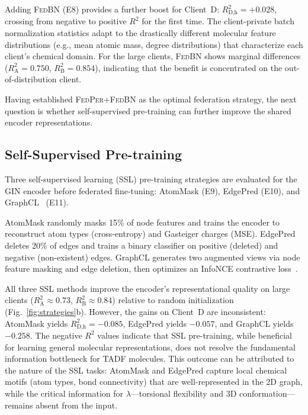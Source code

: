 \documentclass[twocolumn]{article}
\newcommand{\lam}{\lambda}
\newcommand{\Rsq}{R^{2}}
\newcommand{\FedPer}{\textsc{FedPer}}
\newcommand{\FedBN}{\textsc{FedBN}}
\begin{document}
Adding \FedBN{} (E8) provides a further boost for Client~D: $\Rsq_{\text{D,h}} = +0.028$, crossing from negative to positive $\Rsq$ for the first time.
The client-private batch normalization statistics adapt to the drastically different molecular feature distributions (e.g., mean atomic mass, degree distributions) that characterize each client's chemical domain.
For the large clients, \FedBN{} shows marginal differences ($\Rsq_\text{A} = 0.750$, $\Rsq_\text{B} = 0.854$), indicating that the benefit is concentrated on the out-of-distribution client.

Having established \FedPer{}+\FedBN{} as the optimal federation strategy, the next question is whether self-supervised pre-training can further improve the shared encoder representations.

\subsection{Self-Supervised Pre-training}\label{sec:ssl}

Three self-supervised learning (SSL) pre-training strategies are evaluated for the GIN encoder before federated fine-tuning: AtomMask (E9), EdgePred (E10), and GraphCL~\cite{You2020_GraphCL} (E11).

AtomMask randomly masks 15\% of node features and trains the encoder to reconstruct atom types (cross-entropy) and Gasteiger charges (MSE).
EdgePred deletes 20\% of edges and trains a binary classifier on positive (deleted) and negative (non-existent) edges.
GraphCL generates two augmented views via node feature masking and edge deletion, then optimizes an InfoNCE contrastive loss~\cite{Hu2020_SSL}.

All three SSL methods improve the encoder's representational quality on large clients ($\Rsq_\text{A} \approx 0.73$, $\Rsq_\text{B} \approx 0.84$) relative to random initialization (Fig.~\ref{fig:strategies}b).
However, the gains on Client~D are inconsistent: AtomMask yields $\Rsq_{\text{D,h}} = -0.085$, EdgePred yields $-0.057$, and GraphCL yields $-0.258$.
The negative $\Rsq$ values indicate that SSL pre-training, while beneficial for learning general molecular representations, does not resolve the fundamental information bottleneck for TADF molecules.
This outcome can be attributed to the nature of the SSL tasks: AtomMask and EdgePred capture local chemical motifs (atom types, bond connectivity) that are well-represented in the 2D graph, while the critical information for $\lam$---torsional flexibility and 3D conformation---remains absent from the input.
\end{document}
